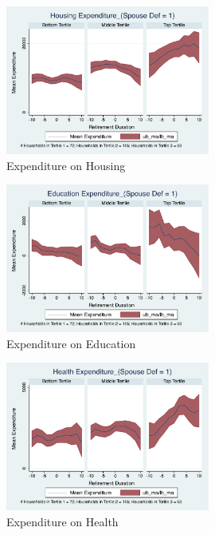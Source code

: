 \documentclass[11pt,onecolumn]{article}
\begin{document}
\clearpage

\begin{figure}[h]
	\caption{Expenditure on Housing}
	\centering
	\includegraphics[width=0.6\textwidth]{../ConsumptionPostRetirement_by_SpouseDef_Cats/Smoothed/1/spouse_def_total_housing_real.pdf}
\end{figure}


\begin{figure}[h]
	\caption{Expenditure on Education}
	\centering
	\includegraphics[width=0.6\textwidth]{../ConsumptionPostRetirement_by_SpouseDef_Cats/Smoothed/1/spouse_def_total_education_real.pdf}
\end{figure}
\clearpage

\begin{figure}[h]
	\caption{Expenditure on Health}
	\centering
	\includegraphics[width=0.6\textwidth]{../ConsumptionPostRetirement_by_SpouseDef_Cats/Smoothed/1/spouse_def_total_healthexpense_real.pdf}
\end{figure}
\end{document}
